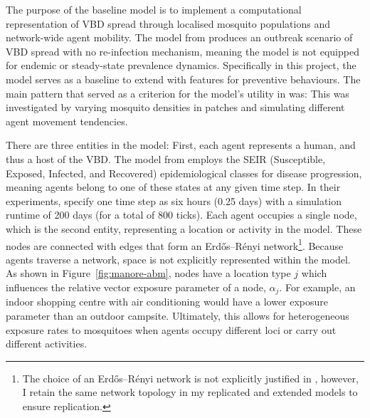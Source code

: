 
The purpose of the baseline model is to implement a computational representation of VBD spread through localised mosquito populations and network-wide agent mobility. The model from \citet{manore_network-patch_2015} produces an outbreak scenario of VBD spread with no re-infection mechanism, meaning the model is not equipped for endemic or steady-state prevalence dynamics. Specifically in this project, the model serves as a baseline to extend with features for preventive behaviours. The main pattern that served as a criterion for the model's utility in \citet{manore_network-patch_2015} was:  This was investigated by varying mosquito densities in patches and simulating different agent movement tendencies.




There are three entities in the model: First, each agent represents a human, and thus a host of the VBD. The model from \citet{manore_network-patch_2015} employs the SEIR (Susceptible, Exposed, Infected, and Recovered) epidemiological classes for disease progression, meaning agents belong to one of these states at any given time step. In their experiments, \citet{manore_network-patch_2015} specify one time step as six hours (0.25 days) with a simulation runtime of 200 days (for a total of 800 ticks). Each agent occupies a single node, which is the second entity, representing a location or activity in the model. These nodes are connected with edges that form an Erdős–Rényi network\footnote{The choice of an Erdős–Rényi network is not explicitly justified in \citet{manore_network-patch_2015}, however, I retain the same network topology in my replicated and extended models to ensure replication.}. Because agents traverse a network, space is not explicitly represented within the model. As shown in Figure~\ref{fig:manore-abm}, nodes have a location type $j$ which influences the relative vector exposure parameter of a node, $\alpha_j$. For example, an indoor shopping centre with air conditioning would have a lower exposure parameter than an outdoor campsite. Ultimately, this allows for heterogeneous exposure rates to mosquitoes when agents occupy different loci or carry out different activities.

